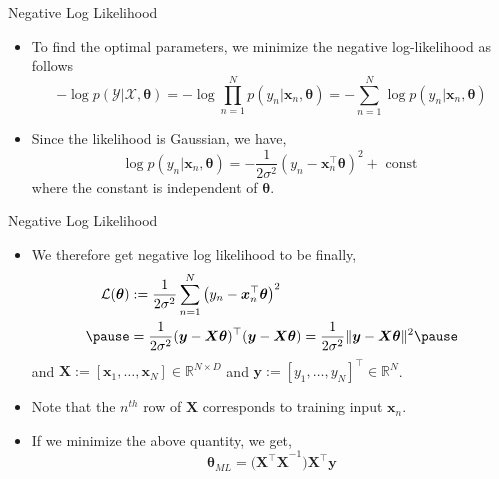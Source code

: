 \documentclass{beamer}
\begin{document}
\begin{frame}{Negative Log Likelihood}
\begin{itemize}
\item To find the optimal parameters, we minimize the negative log-likelihood as follows
\pause
\begin{equation*}
-\log p(\mathcal{Y} | \mathcal{X}, \boldsymbol{\theta})=-\log \prod_{n=1}^{N} p\left(y_{n} | \boldsymbol{x}_{n}, \boldsymbol{\theta}\right)=-\sum_{n=1}^{N} \log p\left(y_{n} | \boldsymbol{x}_{n}, \boldsymbol{\theta}\right)
\end{equation*}
\pause
\item Since the likelihood is Gaussian, we have,
\pause
\begin{equation*}
\log p\left(y_{n} | \boldsymbol{x}_{n}, \boldsymbol{\theta}\right)=-\frac{1}{2 \sigma^{2}}\left(y_{n}-\boldsymbol{x}_{n}^{\top} \boldsymbol{\theta}\right)^{2}+\text { const }
\end{equation*}
where the constant is independent of $\boldsymbol{\theta}$. 
\end{itemize}
\end{frame}

\begin{frame}{Negative Log Likelihood}
\begin{itemize}
\item We therefore get negative log likelihood to be finally,
\pause
\begin{equation*}
\begin{aligned}
\mathcal{L}(\boldsymbol{\theta}) &:=\frac{1}{2 \sigma^{2}} \sum_{n=1}^{N}\left(y_{n}-\boldsymbol{x}_{n}^{\top} \boldsymbol{\theta}\right)^{2} \\
\pause
&=\frac{1}{2 \sigma^{2}}(\boldsymbol{y}-\boldsymbol{X} \boldsymbol{\theta})^{\top}(\boldsymbol{y}-\boldsymbol{X} \boldsymbol{\theta})=\frac{1}{2 \sigma^{2}}\|\boldsymbol{y}-\boldsymbol{X} \boldsymbol{\theta}\|^{2} 
\pause
\end{aligned}
\end{equation*}
and $\boldsymbol{X}:= [\boldsymbol{x}_1, \dots, \boldsymbol{x}_N] \in \mathbb{R}^{N \times D}$ and $\boldsymbol{y}:= [y_1, \dots, y_N]^{\top} \in \mathbb{R}^{N}$. 
\pause
\item Note that the $n^{th}$ row of $\boldsymbol{X}$ corresponds to training input $\boldsymbol{x}_n$. 
\pause
\item If we minimize the above quantity, we get, 
\pause
\begin{equation*}
\boldsymbol{\theta}_{ML} = \big(\boldsymbol{X^{\top}X}^{-1}\big)\boldsymbol{X}^{\top}\boldsymbol{y}
\end{equation*}

\end{itemize}
\end{frame}
\end{document}
